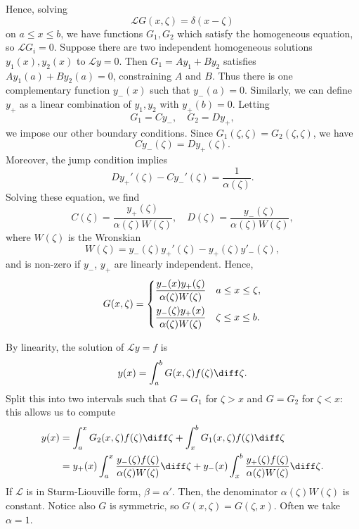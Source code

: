 \documentclass[12pt]{article}
\begin{document}
Hence, solving
\[
	\mathcal{L}G(x, \zeta) = \delta(x - \zeta)
\]
on $a \leq x \leq b$, we have functions $G_1, G_2$ which satisfy the homogeneous equation, so $\mathcal{L}G_i = 0$. Suppose there are two independent homogeneous solutions $y_1(x), y_2(x)$ to $\mathcal{L}y = 0$. Then $G_1 = Ay_1 + By_2$ satisfies $Ay_1(a) + By_2(a) = 0$, constraining $A$ and $B$. Thus there is one complementary function $y_{-}(x)$ such that $y_{-}(a) = 0$. Similarly, we can define $y_{+}$ as a linear combination of $y_1, y_2$ with $y_{+}(b) = 0$. Letting
\[
G_1 = Cy_{-}, \quad G_2 = Dy_{+}
,\]
we impose our other boundary conditions. Since $G_1(\zeta, \zeta) = G_2(\zeta, \zeta)$, we have
\[
	Cy_{-}(\zeta) = Dy_{+}(\zeta)
.\]
Moreover, the jump condition implies
\[
	Dy_{+}'(\zeta) - Cy_{-}'(\zeta) = \frac{1}{\alpha(\zeta)}
.\]
Solving these equation, we find
\[
	C(\zeta) = \frac{y_{+}(\zeta)}{\alpha(\zeta) W(\zeta)}, \quad D(\zeta) = \frac{y_{-}(\zeta)}{\alpha(\zeta)W(\zeta)}
,\]
where $W(\zeta)$ is the Wronskian
\[
	W(\zeta) = y_{-}(\zeta)y_{+}'(\zeta) - y_{+}(\zeta)y'_{-}(\zeta)
,\]
and is non-zero	if $y_{-}$, $y_{+}$ are linearly independent. Hence,
\[
	G(x, \zeta) =
	\begin{dcases}
		\frac{y_{-}(x)y_{+}(\zeta)}{\alpha(\zeta)W(\zeta)} & a \leq x \leq \zeta, \\
		\frac{y_{-}(\zeta)y_{+}(x)}{\alpha(\zeta)W(\zeta)} & \zeta \leq x \leq b.
	\end{dcases}
\]

By linearity, the solution of $\mathcal{L}y = f$ is
\[
	y(x) = \int_{a}^{b} G(x, \zeta)f(\zeta) \diff \zeta
.\]
Split this into two intervals such that $G = G_1$ for $\zeta > x$ and $G = G_2$ for $\zeta < x$: this allows us to compute
\begin{align*}
	y(x) &= \int_{a}^{x} G_2(x, \zeta) f(\zeta) \diff \zeta + \int_{x}^{b}G_1(x, \zeta)f(\zeta) \diff \zeta \\
	     &= y_{+}(x) \int_{a}^{x} \frac{y_{-}(\zeta) f(\zeta)}{\alpha(\zeta)W(\zeta)}\diff \zeta + y_{-}(x) \int_{x}^{b} \frac{y_{+}(\zeta) f(\zeta)}{\alpha(\zeta)W(\zeta)} \diff \zeta.
\end{align*}
If $\mathcal{L}$ is in Sturm-Liouville form, $\beta = \alpha'$. Then, the denominator $\alpha(\zeta)W(\zeta)$ is constant. Notice also $G$ is symmetric, so $G(x, \zeta) = G(\zeta, x)$. Often we take $\alpha = 1$.
\end{document}
